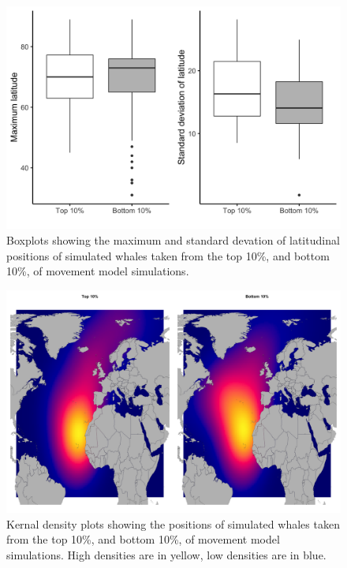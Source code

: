 \documentclass[a4paper,10pt]{article}
\begin{document}
    \begin{figure}[!htbp]
    \centering
      \includegraphics[width=\linewidth]{figures/Figure-S7-boxplots.png}
      \caption{Boxplots showing the maximum and standard devation of latitudinal positions of simulated whales taken from the top 10\%, and bottom 10\%, of movement model simulations.} 
      \label{figs7}
  \end{figure}

\begin{landscape}
    \begin{figure}[!htbp]
    \centering
      \includegraphics[width=\linewidth]{figures/Figure-S8-kernals.png}
      \caption{Kernal density plots showing the positions of simulated whales taken from the top 10\%, and bottom 10\%, of movement model simulations. 
      High densities are in yellow, low densities are in blue.}
      \label{figs8}
  \end{figure}
\end{landscape}



\end{document}
